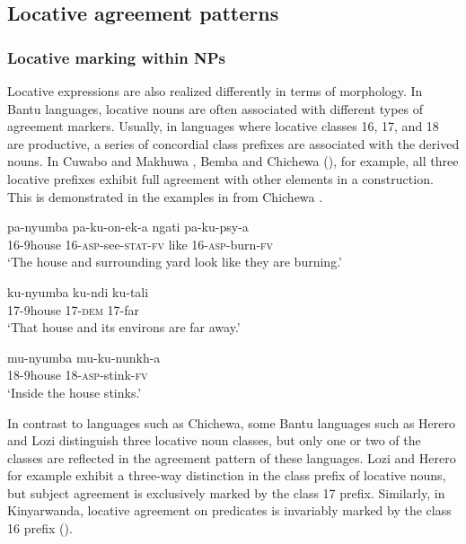 \documentclass[output=paper]{langscibook}
\begin{document}
\subsection{Locative agreement patterns}
\label{sec:mallya:4.3}

\subsubsection{Locative marking within NPs}
\label{sec:mallya:4.3.1}

Locative expressions are also realized differently in terms of morphology. In Bantu languages, locative nouns are often associated with different types of agreement markers. Usually, in languages where locative classes 16, 17, and 18 are productive, a series of concordial class prefixes are associated with the derived nouns. In Cuwabo and Makhuwa \citep{Guérois2016}, Bemba \citep{Marten2012} and Chichewa (\citealt{BresnanKanerva1989, Carstens1997}), for example, all three locative prefixes exhibit full agreement with other elements in a construction. This is demonstrated in the examples in  from Chichewa \citep[362]{Carstens1997}.

\ea%
    \label{ex:mallya:8}
    \ea\label{ex:mallya:8a} 
    \gll pa-nyumba      pa-ku-on-ek-a        ngati     pa-ku-psy-a\\
        16-9house      16-\textsc{asp}-see-\textsc{stat}-\textsc{fv}    like         16-\textsc{asp}-burn-\textsc{fv}\\
    \glt    ‘The house and surrounding yard look like they are burning.’

  \ex\label{ex:mallya:8b} 
  \gll ku-nyumba      ku-ndi      ku-tali\\
    17-9house    17-\textsc{dem}    17-far\\
   \glt ‘That house and its environs are far away.’

  \ex\label{ex:mallya:8c}
  \gll mu-nyumba  mu-ku-nunkh-a\\
      18-9house  18-\textsc{asp}-stink-\textsc{fv}\\
   \glt `Inside the house stinks.’
    \z
\z

In contrast to languages such as Chichewa, some Bantu languages such as Herero and Lozi \citep{MartenEtAl2007} distinguish three locative noun classes, but only one or two of the classes are reflected in the agreement pattern of these languages. Lozi and Herero for example exhibit a three-way distinction in the class prefix of locative nouns, but subject agreement is exclusively marked by the class 17 prefix. Similarly, in Kinyarwanda, locative agreement on predicates is invariably marked by the class 16 prefix (\citealt{ZellerNgoboka2018}).
\end{document}
